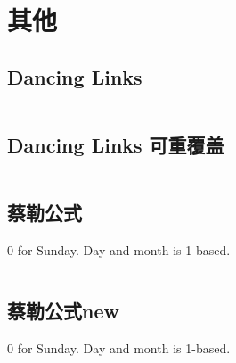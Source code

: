 \chapter{其他}
\section{Dancing Links}
\inputminted{cpp}{\source/others/dancing-links.cpp}
\section{Dancing Links 可重覆盖}
\inputminted{cpp}{\source/others/dancing-links-multi.cpp}
\section{蔡勒公式}
0 for Sunday. Day and month is 1-based.
\inputminted{cpp}{\source/others/zellers-congruence.cpp}
\section{蔡勒公式new}
0 for Sunday. Day and month is 1-based.
\inputminted{cpp}{\source/others/zeller.cpp}

